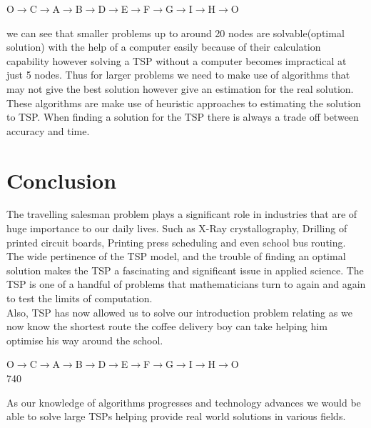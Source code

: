 \documentclass[a4paper]{article}
\begin{document}
\begin{center}
     O$\to$C$\to$A$\to$B$\to$D$\to$E$\to$F$\to$G$\to$I$\to$H$\to$O
\end{center}
we can see that smaller problems up to around 20 nodes are solvable(optimal solution) with the help of a computer easily because of their calculation capability however solving a TSP without a computer becomes impractical at just 5 nodes. Thus for larger problems we need to make use of algorithms that may not give the best solution however give an estimation for the real solution. These algorithms are make use of heuristic approaches to estimating the solution to TSP. When finding a solution for the TSP there is always a trade off between accuracy and time.

\section{Conclusion}
The travelling salesman problem plays a significant role in industries that are of huge importance to our daily lives. Such as X-Ray crystallography, Drilling of printed circuit boards, Printing press scheduling and even school bus routing. The wide pertinence of the TSP model,  and the trouble of finding an optimal solution makes the TSP a fascinating and significant issue in applied science. The TSP is one of a handful of  problems that mathematicians turn to again and again to test the limits of computation.\\
Also, TSP has now allowed us to solve our introduction problem relating as we now know the shortest route the coffee delivery boy can take helping him optimise his way around the school.\\
\begin{center}
     O$\to$C$\to$A$\to$B$\to$D$\to$E$\to$F$\to$G$\to$I$\to$H$\to$O\\
     740
\end{center}
As our knowledge of algorithms progresses and technology advances we would be able to solve large TSPs helping provide real world solutions in various fields.
\newpage

\printbibliography
\end{document}
